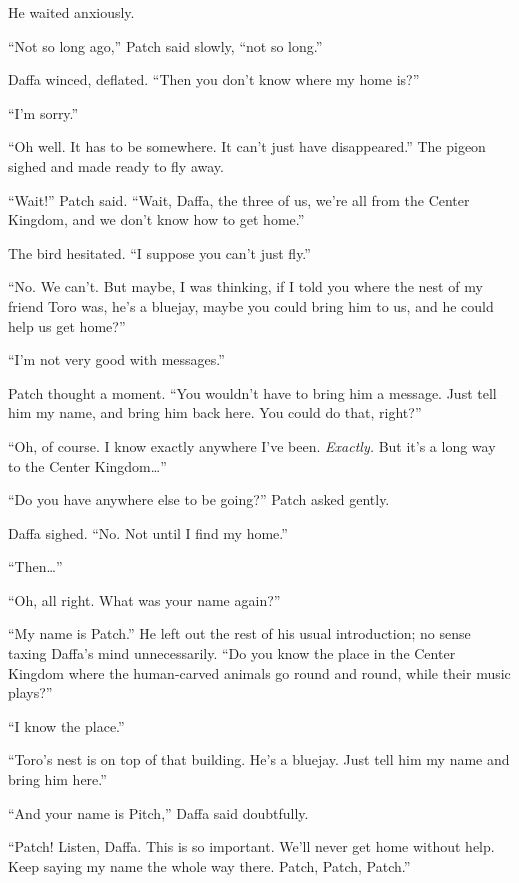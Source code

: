 \documentclass[ebook,oneside,openany,17pt]{memoir}
\newenvironment{tolerant}[1]{%
  \par\tolerance=#1\relax
}{%
  \par
}
\begin{document}
He waited anxiously.

“Not so long ago,” Patch said slowly, “not so long.”

\begin{tolerant}{1000}
Daffa winced, deflated. “Then you don’t know where my home is?”
\end{tolerant}

“I’m sorry.”

\begin{tolerant}{2000}
“Oh well. It has to be somewhere. It can’t just have disappeared.”
The pigeon sighed and made ready to fly away.
\end{tolerant}

“Wait!” Patch said. “Wait, Daffa, the three of us, we’re all from the
Center Kingdom, and we don’t know how to get home.”

The bird hesitated. “I suppose you can’t just fly.”

“No. We can’t. But maybe, I was thinking, if I told you where the nest
of my friend Toro was, he’s a bluejay, maybe you could bring him to
us, and he could help us get home?”

“I’m not very good with messages.”

Patch thought a moment. “You wouldn’t have to bring him a
message. Just tell him my name, and bring him back here. You could do
that, right?”

“Oh, of course. I know exactly anywhere I’ve been. \emph{Exactly.}
But it’s a long way to the Center Kingdom…”

“Do you have anywhere else to be going?” Patch asked gently.

Daffa sighed. “No. Not until I find my home.”

“Then…”

“Oh, all right. What was your name again?”

\begin{tolerant}{500}
“My name is Patch.” He left out the rest of his usual introduction; no
sense taxing Daffa’s mind unnecessarily. “Do you know the place in the
Center Kingdom where the human-carved animals go round and round,
while their music plays?”
\end{tolerant}

“I know the place.”

“Toro’s nest is on top of that building. He’s a bluejay. Just tell him
my name and bring him here.”

“And your name is Pitch,” Daffa said doubtfully.

“Patch! Listen, Daffa. This is so important. We’ll never get home
without help. Keep saying my name the whole way there. Patch, Patch,
Patch.”
\end{document}
